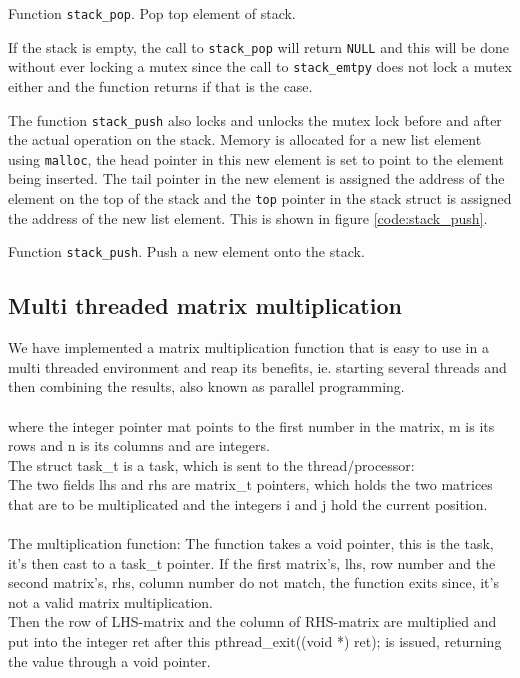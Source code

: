 {Function \texttt{stack\_pop}. Pop top element of stack.}

If the stack is empty, the call to \verb|stack_pop| will return \verb|NULL| and
this will be done without ever locking a mutex since the call to
\verb|stack_emtpy| does not lock a mutex either and the function returns if that
is the case.

The function \verb|stack_push| also locks and unlocks the mutex lock before and
after the actual operation on the stack. Memory is allocated for a new list
element using \verb|malloc|, the head pointer in this new element is set to
point to the element being inserted. The tail pointer in the new element is
assigned the address of the element on the top of the stack and the \verb|top|
pointer in the stack struct is assigned the address of the new list element.
This is shown in figure \ref{code:stack_push}.

{Function \texttt{stack\_push}. Push a new element onto the stack.}


\subsection{Multi threaded matrix multiplication}
We have implemented a matrix multiplication function that is easy to use in a
multi threaded environment and reap its benefits, ie. starting several threads
and then combining the results, also known as parallel programming.\\
\\
where the integer pointer \textsf{mat} points to the first number in the matrix,
\textsf{m} is its rows and \textsf{n} is its columns and are integers.\\
The \textsf{struct task\_t} is a task, which is sent to the thread/processor:\\
The two fields \textsf{lhs} and \textsf{rhs} are matrix\_t pointers, which holds the two
matrices that are to be multiplicated and the integers \textsf{i} and \textsf{j} hold
the current position.\\
\\
The multiplication function:
The function takes a void pointer, this is the task, it's then cast to a task\_t
pointer. If the first matrix's, lhs, row number and the second matrix's, rhs,
column number do not match, the function exits since, it's not a valid matrix
multiplication.\\
Then the row of LHS-matrix and the column of RHS-matrix are multiplied and
put into the integer \textsf{ret} after this \textsf{pthread\_exit((void *)
ret);} is issued, returning the value through a void pointer.\\

